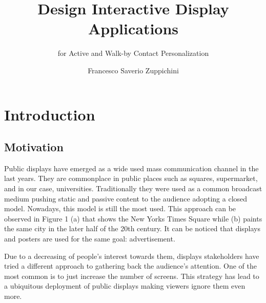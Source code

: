 \documentclass[]{usiinfbachelorproject}
\author{Francesco Saverio Zuppichini}
\title{Design Interactive Display Applications}
\subtitle{for Active and Walk-by Contact Personalization}
\begin{document}
\maketitle

\tableofcontents
\newpage
\section{Introduction}
\subsection{Motivation}

Public displays have emerged as a wide used mass communication channel in the last years. They are commonplace in public places such as squares, supermarket, and in our case, universities. 
Traditionally they were used as a common broadcast medium pushing static and passive content to the audience adopting a closed model. Nowadays, this model is still the most used. This approach can be observed in Figure 1 (a) that shows the New Yorks Times Square while (b) paints the same city in the later half of the 20th century. It can be noticed that displays and posters are used for the same goal: advertisement.

Due to a decreasing of people's interest towards them, displays stakeholders have tried a different approach to gathering back the audience's attention. One of the most common is to just increase the number of screens. This strategy has lead to a ubiquitous deployment of public displays making viewers ignore them even more.

\begin{figure}[H]
  \centering
  \hfill
  \caption{}
\end{figure} 
\end{document}
